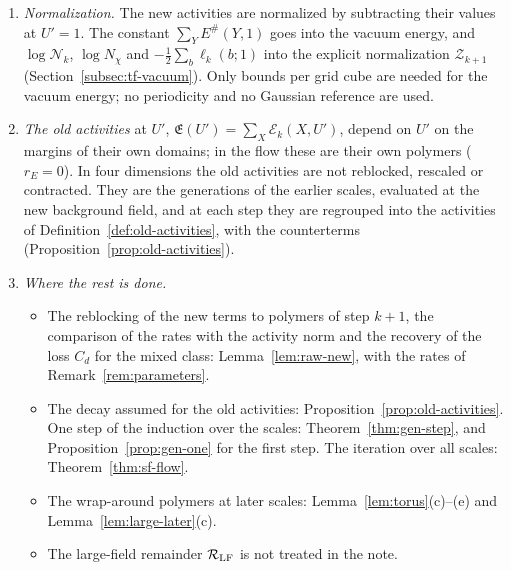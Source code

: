 \begin{remark}\label{rem:sf-step-remains}
\begin{enumerate}[label=(\alph*)]
\item \emph{Normalization.} The new activities are normalized by subtracting their values at $U'=1$. The constant $\sum_YE^\#(Y,1)$ goes into the vacuum energy, and $\log\mathcal N_k$, $\log N_\chi$ and $-\frac12\sum_b\ell_k(b;1)$ into the explicit normalization $\mathcal Z_{k+1}$ (Section~\ref{subsec:tf-vacuum}). Only bounds per grid cube are needed for the vacuum energy; no periodicity and no Gaussian reference are used.
\item \emph{The old activities} at $U'$, $\mathfrak E(U')=\sum_X\mathcal E_k(X,U')$, depend on $U'$ on the margins of their own domains; in the flow these are their own polymers ($r_E=0$). In four dimensions the old activities are not reblocked, rescaled or contracted. They are the generations of the earlier scales, evaluated at the new background field, and at each step they are regrouped into the activities of Definition~\ref{def:old-activities}, with the counterterms (Proposition~\ref{prop:old-activities}).
\item \emph{Where the rest is done.}
  \begin{itemize}
  \item The reblocking of the new terms to polymers of step $k+1$, the comparison of the rates with the activity norm and the recovery of the loss $C_d$ for the mixed class: Lemma~\ref{lem:raw-new}, with the rates of Remark~\ref{rem:parameters}.
  \item The decay assumed for the old activities: Proposition~\ref{prop:old-activities}. One step of the induction over the scales: Theorem~\ref{thm:gen-step}, and Proposition~\ref{prop:gen-one} for the first step. The iteration over all scales: Theorem~\ref{thm:sf-flow}.
  \item The wrap-around polymers at later scales: Lemma~\ref{lem:torus}(c)--(e) and Lemma~\ref{lem:large-later}(c).
  \item The large-field remainder $\mathcal R_{\rm LF}$ is not treated in the note.
  \end{itemize}
\end{enumerate}
\end{remark}
